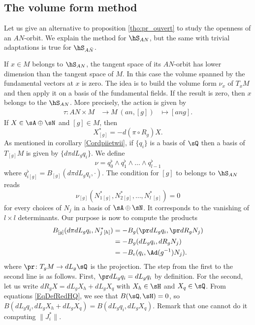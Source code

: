 \subsection{The volume form method}    \label{subsecVolumeForm}

Let us give an alternative to proposition \ref{tho:pr_ouvert} to study the openness of an $AN$-orbit. We explain the method for $\hS_{AN}$, but the same with trivial adaptations is true for $\hS_{A\bar{N}}$.

If $x\in M$ belongs to $\hS_{AN}$, the tangent space of its $AN$-orbit has lower dimension than the tangent space of $M$.  In this case the volume spanned by the fundamental vectors at $x$ is zero.  The idea is to build the volume form $\nu_x$ of $T_xM$ and then apply it on a basis of the fundamental fields.  If the result is zero, then $x$ belongs to the $\hS_{AN}$.  More precisely, the action is given by
		\begin{equation}
		\begin{aligned}
			\tau \colon AN\times M &\to M\
			(an,[g])&\mapsto [ang].
		\end{aligned}
	\end{equation}	
If $X\in\sA\oplus\sN$ and $[g]\in M$, then
\begin{equation}
  X^*_{[g]}=-d(\pi\circ R_g)X.
\end{equation}
As mentioned in corollary \ref{Cordpiietwii}, if $\{q_i\}$ is a basis of $\sQ$ then a basis of $T_{[g]}M$ is given by $\{d\pi dL_gq_i\}$. We define
\[
\nu=q_0^{\flat}\wedge q_1^{\flat}\wedge \ldots \wedge
q_{l-1}^{\flat}
\]
where $q_{i[g]}^{\flat}=B_{[g]}(d\pi dL_g q_i,\cdot)$. The condition for $[g]$ to belongs to $\hS_{AN}$ reads
\begin{equation}\label{eq:nusurN}
\nu_{[g]}(N_1^*{}_{[g]},N_2^*{}_{[g]},\ldots,N_l^*{}_{[g]})=0
\end{equation}
for every choices of $N_j$ in a basis of $\sA\oplus\sN$. It corresponds to the vanishing of $l \times l$ determinants. Our purpose is now to compute the products
\[
\begin{split}
  B_{[g]}(d\pi dL_g q_i,N^*_j{}_{[h]})	&=-B_g(\pr dL_g q_i,\pr dR_g N_j)\\
					&=-B_g(dL_g q_i,dR_g N_j)\\
					&=-B_e(q_i,\Ad(g^{-1})N_j).
\end{split}
\]
where $\pr\colon T_{g}M\to dL_{g}\sQ$ is the projection. The step from the first to the second line is as follows. First, $\pr dL_gq_i=dL_gq_i$ by definition. For the second, let us write $dR_g X=dL_g X_h+dL_g X_q$ with $X_h\in\sH$ and $X_q\in\sQ$. From equations \eqref{EqDefRedHQ}, we see that $B(\sQ,\sH)=0$, so $B(dL_g q_i,dL_g X_h+dL_g X_q)=B(dL_g q_i,dL_g X_q)$. Remark that one cannot do it computing $\|J_i^*\|$.

